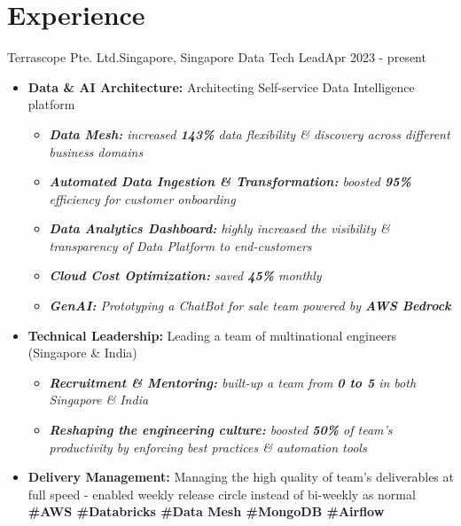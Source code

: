 \def\labelitemi{$\circ$}


\section{Experience}\label{sec:experience}
\resumeSubHeadingListStart

\resumeSubheading
{Terrascope Pte. Ltd.}{Singapore, Singapore}
{Data Tech Lead}{Apr 2023 - present}
\begin{itemize}
    \item \textbf{Data \& AI Architecture:} Architecting Self-service Data Intelligence platform
    \begin{itemize}
        \item{\emph{\textbf{Data Mesh:} increased \textbf{143\%} data flexibility \& discovery across different business domains}}
        \item{\emph{\textbf{Automated Data Ingestion \& Transformation:} boosted \textbf{95\%} efficiency for customer onboarding}}
        \item{\emph{\textbf{Data Analytics Dashboard:} highly increased the visibility \& transparency of Data Platform to end-customers}}
        \item {\emph{\textbf{Cloud Cost Optimization:} saved \textbf{45\%} monthly}}
        \item {\emph{\textbf{GenAI:} Prototyping a ChatBot for sale team powered by \textbf{AWS Bedrock}}}
    \end{itemize}
    \item \textbf{Technical Leadership:} Leading a team of multinational engineers (Singapore \& India)
    \begin{itemize}
        \item{\emph{\textbf{Recruitment \& Mentoring:} built-up a team from \textbf{0 to 5} in both Singapore \& India}}
        \item{\emph{\textbf{Reshaping the engineering culture:} boosted \textbf{50\%} of team's productivity by enforcing best practices \& automation tools}}
    \end{itemize}
    \item \textbf{Delivery Management:} Managing the high quality of team's deliverables at full speed - enabled weekly release circle instead of bi-weekly as normal
    \textbf{\scriptsize{\#AWS \#Databricks \#Data Mesh \#MongoDB \#Airflow}}
\end{itemize}


